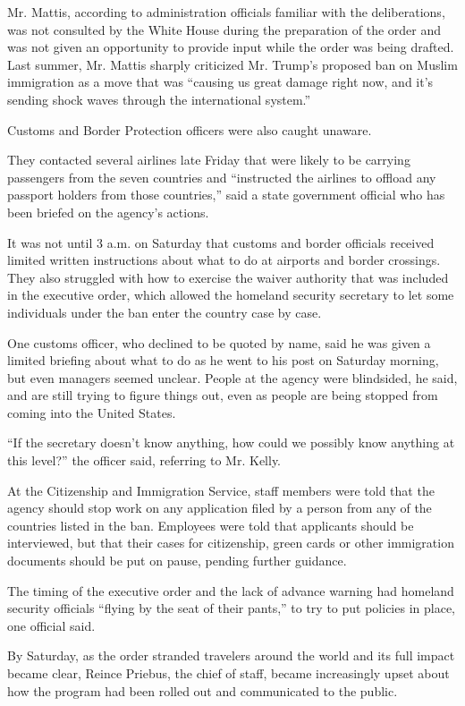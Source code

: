 Mr. Mattis, according to administration officials familiar with the
deliberations, was not consulted by the White House during the
preparation of the order and was not given an opportunity to provide
input while the order was being drafted. Last summer, Mr. Mattis sharply
criticized Mr. Trump's proposed ban on Muslim immigration as a move that
was ``causing us great damage right now, and it's sending shock waves
through the international system.''

Customs and Border Protection officers were also caught unaware.

They contacted several airlines late Friday that were likely to be
carrying passengers from the seven countries and ``instructed the
airlines to offload any passport holders from those countries,'' said a
state government official who has been briefed on the agency's actions.

It was not until 3 a.m. on Saturday that customs and border officials
received limited written instructions about what to do at airports and
border crossings. They also struggled with how to exercise the waiver
authority that was included in the executive order, which allowed the
homeland security secretary to let some individuals under the ban enter
the country case by case.

One customs officer, who declined to be quoted by name, said he was
given a limited briefing about what to do as he went to his post on
Saturday morning, but even managers seemed unclear. People at the agency
were blindsided, he said, and are still trying to figure things out,
even as people are being stopped from coming into the United States.

``If the secretary doesn't know anything, how could we possibly know
anything at this level?'' the officer said, referring to Mr. Kelly.

At the Citizenship and Immigration Service, staff members were told that
the agency should stop work on any application filed by a person from
any of the countries listed in the ban. Employees were told that
applicants should be interviewed, but that their cases for citizenship,
green cards or other immigration documents should be put on pause,
pending further guidance.

The timing of the executive order and the lack of advance warning had
homeland security officials ``flying by the seat of their pants,'' to
try to put policies in place, one official said.

By Saturday, as the order stranded travelers around the world and its
full impact became clear, Reince Priebus, the chief of staff, became
increasingly upset about how the program had been rolled out and
communicated to the public.

